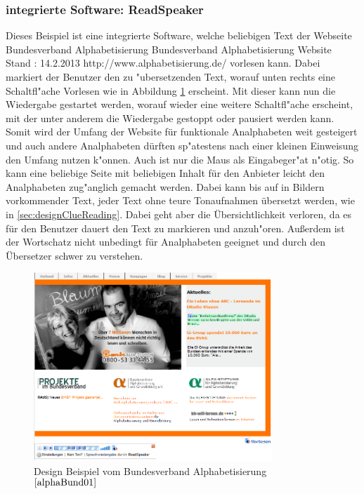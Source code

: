 \subsubsection{ integrierte Software: ReadSpeaker}

Dieses Beispiel ist eine integrierte Software, welche beliebigen Text der Webseite Bundesverband Alphabetisierung
						{Bundesverband Alphabetisierung Website}
						{Stand : 14.2.2013}
						{http://www.alphabetisierung.de/}
vorlesen kann.
Dabei markiert der Benutzer den zu "ubersetzenden Text, worauf unten rechts eine Schaltfl"ache \glqq Vorlesen\grqq{} wie in Abbildung  \ref{fig:DesignBeispiel1} erscheint. Mit dieser kann nun die Wiedergabe gestartet werden, worauf wieder eine weitere Schaltfl"ache erscheint, mit der unter anderem die Wiedergabe gestoppt oder pausiert werden kann.\\
Somit wird der Umfang der Website für funktionale Analphabeten weit gesteigert und auch andere Analphabeten dürften sp"atestens nach einer kleinen Einweisung den Umfang nutzen k"onnen. Auch ist nur die Maus als Eingabeger"at n"otig. So kann eine beliebige Seite mit beliebigen Inhalt für den Anbieter leicht den Analphabeten zug"anglich gemacht werden. Dabei kann bis auf in Bildern vorkommender Text, jeder Text ohne teure Tonaufnahmen übersetzt werden, wie in \ref{sec:designClueReading}. Dabei geht aber die Übersichtlichkeit verloren, da es für den Benutzer dauert den Text zu markieren und anzuh"oren. Außerdem ist der Wortschatz nicht unbedingt für Analphabeten geeignet und durch den Übersetzer schwer zu verstehen.
\begin{figure}[h]
	\centering
		\includegraphics[width=0.80\textwidth]{Daten/DesignBeispiel1.png}
	\caption{Design Beispiel vom Bundesverband Alphabetisierung $^{\ref{alphaBund01}}$}
	\label{fig:DesignBeispiel1}
\end{figure}

